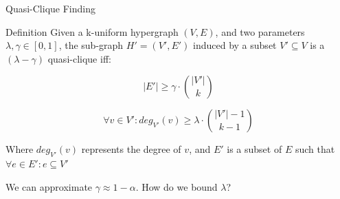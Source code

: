 \documentclass[10pt,compress]{beamer}
\begin{document}
\begin{frame}{Quasi-Clique Finding}
    \begin{alertblock}{Definition}
    Given a k-uniform hypergraph $(V,E)$, and two parameters $\lambda, \gamma \in [0,1]$,
    the sub-graph $H'=(V',E')$ induced by a subset $V' \subseteq V$ is a
    $(\lambda-\gamma)$ quasi-clique iff:
    
    \begin{equation}
        |E'| \ge \gamma \cdot \binom{|V'|}{k}
        \label{eq:edge_hyperclique}
    \end{equation}
    
    \begin{equation}
        \forall v \in V': deg_{V'}(v) \ge \lambda \cdot \binom{|V'| - 1}{k - 1}
        \label{eq:deg_hyperclique}
    \end{equation}

    Where $deg_{V'}(v)$ represents the degree of $v$, and $E'$ is a subset of $E$ such that
    $\forall e \in E' : e \subseteq V'$
    \end{alertblock}
    
    We can approximate $\gamma \approx 1 - \alpha$. How do we bound $\lambda$?

\end{frame}
\end{document}
